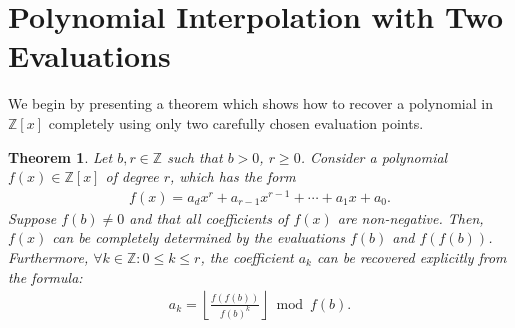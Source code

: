 \documentclass{article}
\theoremstyle{plain}
\newtheorem{theorem}{Theorem}
\theoremstyle{definition}
\newcommand{\floor}[1]{\left\lfloor #1 \right\rfloor}
\begin{document}
\section{Polynomial Interpolation with Two Evaluations}
We begin by presenting a theorem which shows how to recover a polynomial in $\mathbb{Z}[x]$ completely using only two carefully chosen evaluation points.

\begin{theorem} \label{theorem:encoding}
Let $b, r \in \mathbb{Z}$ such that $b > 0$, $r \geq 0$. Consider a polynomial $f(x) \in \mathbb{Z}[x]$ of degree $r$, which has the form
\begin{align*}
    f(x) = a_d x^r + a_{r-1} x^{r-1} + \cdots + a_1 x + a_0 .
\end{align*}
Suppose $f(b) \not= 0$ and that all coefficients of $f(x)$ are non-negative. Then, $f(x)$ can be completely determined by the evaluations $f(b)$ and $f(f(b))$. Furthermore, $\forall k \in \mathbb{Z} : 0 \leq k \leq r$, the coefficient $a_k$ can be recovered explicitly from the formula:
\begin{align*}
a_k = \floor{\frac{f(f(b))}{f(b)^{k}}} \bmod{f(b)} .
\end{align*}
\end{theorem}
\end{document}
